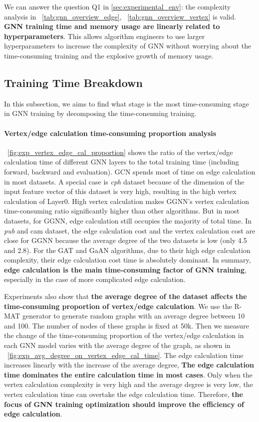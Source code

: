 We can answer the question Q1 in \ref{sec:experimental_env}: the complexity analysis in \tablename~\ref{tab:gnn_overview_edge}, \tablename~\ref{tab:gnn_overview_vertex} is valid. 
\textbf{GNN training time and memory usage are linearly related to hyperparameters}.
This allows algorithm engineers to use larger hyperparameters to increase the complexity of GNN without worrying about the time-consuming training and the explosive growth of memory usage.

\subsection{Training Time Breakdown}
\label{sec:training_time_breakdown}

In this subsection, we aims to find what stage is the most time-consuming stage in GNN training by decomposing the time-consuming training.

\paragraph{Vertex/edge calculation time-consuming proportion analysis}

\figurename~\ref{fig:exp_vertex_edge_cal_proportion} shows the ratio of the vertex/edge calculation time of different GNN layers
to the total training time (including forward, backward and evaluation). GCN spends most of time on edge calculation in most datasets. A special case is  \textit{cph} dataset because of
the dimension of the input feature vector of this dataset is very high, resulting in the high vertex calculation of Layer0.
High vertex calculation makes GGNN's vertex calculation time-consuming ratio significantly higher than other algorithms.
But in most datasets, for GGNN, edge calculation still occupies the majority of total time. 
In \textit{pub} and cam dataset, the edge calculation cost and the vertex calculation cost are close for GGNN 
because the average degree of the two datasets is low (only 4.5 and 2.8).
For the GAT and GaAN algorithms, due to their high edge calculation complexity, their edge calculation cost time is absolutely dominant. 
In summary, \textbf{edge calculation is the main time-consuming factor of GNN training}, especially in the case of more complicated edge calculation.

Experiments also show that \textbf{the average degree of the dataset affects the time-consuming proportion of vertex/edge calculation}. 
We use the R-MAT generator to generate random graphs with an average degree between 10 and 100. The number of nodes of these graphs is fixed at 50k.
Then we measure the change of the time-consuming proportion of the vertex/edge calculation in each GNN model varies with the average degree of the graph,
as shown in \figurename~\ref{fig:exp_avg_degree_on_vertex_edge_cal_time}. The edge calculation time increases linearly with the increase of the average degree,
\textbf{The edge calculation time dominates the entire calculation time in most cases}. 
Only when the vertex calculation complexity is very high and the average degree is very low, the vertex calculation time can overtake the edge calculation time.
Therefore, \textbf{the focus of GNN training optimization should improve the efficiency of edge calculation}.

